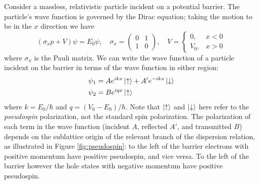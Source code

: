 \documentclass[edeposit,fullpage,draftthesis]{uiucthesis2009}
\begin{document}
        Consider a massless, relativistic particle incident on a potential barrier. The particle's
        wave function is governed by the Dirac equation; taking the
        motion to be in the $x$ direction we have
        \begin{equation}
            \left( \sigma_x p + V \right) \psi = E_0\psi, \quad \sigma_x = \left( \begin{matrix} 0 & 1 \\ 1 & 0 \end{matrix}\right), \quad V=\begin{cases} 0, & x<0 \\ V_0, & x>0 \end{cases}
        \end{equation}
        where $\sigma_x$ is the Pauli matrix. We can write the wave function of a particle incident
        on the barrier in terms of the wave function in either region:
        \begin{align}
        \begin{split}
            \psi_1 &= Ae^{ikx} \ket{\uparrow} + A'e^{-ikx} \ket{\downarrow} \\
            \psi_2 &= Be^{iqx} \ket{\uparrow}
        \end{split}
        \end{align}
        where $k=E_0 / \hbar$ and $q = (V_0 - E_0) / \hbar$.
        Note that $\ket{\uparrow}$ and $\ket{\downarrow}$ here refer to the \textit{pseudospin}
        polarization, not the standard spin polarization. The polarization of each term in the 
        wave function (incident $A$, reflected $A'$, and transmitted $B$) depends on the 
        sublattice origin of the relevant branch of the dispersion relation, as illustrated in Figure
        \ref{fig:pseudospin}: to the left of the barrier electrons with positive momentum have
        positive pseudospin, and vice versa. To the left of the barrier however the hole states with
        negative momentum have positive pseudospin.
\end{document}
